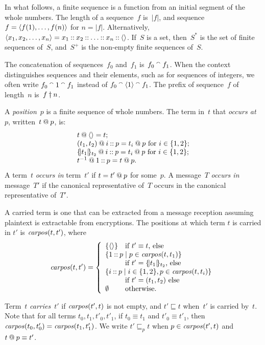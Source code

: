 \documentclass[12pt]{article}
\theoremstyle{definition}
\newcommand{\carpos}{\fn{carpos}}
\begin{document}
In what follows, a finite sequence is a function from an initial
segment of the whole numbers.  The length of a sequence~$f$ is~$|f|$,
and sequence~$f=\langle f(1),\ldots,f(n)\rangle$ for $n=|f|$.  Alternatively,
$\langle x_1,x_2,\ldots,x_n\rangle =x_1\mathbin{::} x_2\mathbin{::}\ldots\mathbin{::}
x_n\mathbin{::}\langle\rangle$.  If~$S$ is a set, then~$S^\ast$ is the set of finite
sequences of~$S$, and~$S^+$ is the non-empty finite sequences of~$S$.

The concatenation of sequences~$f_0$ and~$f_1$ is~$f_0\mathbin{{}^\smallfrown} f_1$.
When the context distinguishes sequences and their elements, such as
for sequences of integers, we often write $f_0\mathbin{{}^\smallfrown} 1 \mathbin{{}^\smallfrown} f_1$
instead of $f_0\mathbin{{}^\smallfrown}\langle1\rangle\mathbin{{}^\smallfrown} f_1$.  The prefix of sequence~$f$
of length~$n$ is~$f\dagger n$.

A \emph{position}~$p$ is a finite sequence of whole numbers.  The
term in~$t$ that \emph{occurs at}~$p$, written~$t\mathbin{@} p$, is:
$$\begin{array}{l}
t\mathbin{@}\langle\rangle=t;\\
(t_1,t_2)\mathbin{@} i\mathbin{::} p=t_i\mathbin{@} p\mbox{ for $i\in\{1,2\}$};\\
\{\!|t_1|\!\}_{t_2}\mathbin{@} i\mathbin{::} p=t_i\mathbin{@} p\mbox{ for
  $i\in\{1,2\}$};\\
t^{-1}\mathbin{@} 1\mathbin{::} p=t\mathbin{@} p.
\end{array}$$
A term~$t$ \emph{occurs in} term~$t'$ if $t=t'\mathbin{@} p$ for some~$p$.
A message~$T$ \emph{occurs in} message~$T'$ if the canonical
representative of~$T$ occurs in the canonical representative of~$T'$.

A carried term is one that can be extracted from a message reception
assuming plaintext is extractable from encryptions.  The
positions at which term $t$ is carried in
$t'$ is $\carpos(t,t')$, where
$$\carpos(t,t')=\left\{
\begin{array}{ll}
\{\seq{}\}&\mbox{if $t'\equiv t$, else}\\
\multicolumn{2}{l}{\{1\cons p \mid
p\in\carpos(t,t_1)\}}\\
& \mbox{if $t'=\enc{t_1}{t_2}$, else}\\
\multicolumn{2}{l}{\{i\cons p \mid
i\in\{1,2\}, p\in\carpos(t,t_i)\}} \\
& \mbox{if $t'=(t_1,t_2)$ else}\\
\emptyset&\mbox{otherwise.}
\end{array}\right.$$

Term~$t$ \emph{carries}~$t'$ if $\carpos(t',t)$ is not empty, and
$t'\sqsubseteq t$ when~$t'$ is carried by~$t$.  Note that for all
terms $t_0,t_1,t'_0,t'_1$, if $t_0\equiv t_1$ and $t'_0\equiv t'_1$,
then $\carpos(t_0,t'_0)= \carpos(t_1,t'_1)$.  We write $t' \sqsubseteq_p t$
when $p \in \carpos(t',t)$ and $t \mathbin{@} p \equiv t'$.
\end{document}
